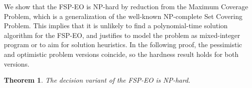 \documentclass[11pt, a4paper]{article}
\newtheorem{theorem}{Theorem}
\newcommand{\fspeo}{FSP-EO\xspace}
\newcommand{\AMil}[1]{\todo[color=green!50!black, textcolor=white, inline, author=AM]{#1}}
\begin{document}


We show that the \fspeo is NP-hard by reduction from the Maximum
Coverage Problem, which is a generalization of the well-known
NP-complete Set Covering Problem. This implies that it is unlikely to find a polynomial-time solution algorithm for the \fspeo, and justifies to model the problem as mixed-integer program or to aim for solution heuristics. In the following proof, the pessimistic and optimistic problem versions coincide, so the hardness result holds for both versions.

\begin{theorem}\label{theorem:complexity}
The decision variant of the \fspeo is NP-hard.
\end{theorem}
\end{document}
